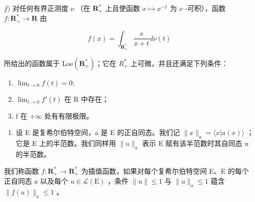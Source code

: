 \(f)\) 对任何有界正测度 \(\nu\) （在 \(\mathbf{R}_{+}^{*}\) 上且使函数 \(x\mapsto x^{-1}\) 为 \(\nu\) -可积），函数 \(f\colon\mathbf{R}_{+}^{*}\to\mathbf{R}\) 由

\[
f (x) = \int_ {\mathbf {R} _ {+} ^ {*}} \frac {x}{x + t} d \nu (t)
\]

所给出的函数属于 \(\text{Loe}(\mathbf{R}_{+}^{*})\)；它在 \(R_{+}^{*}\) 上可微，并且还满足下列条件：

\begin{enumerate}
\def\labelenumi{(\roman{enumi})}
\item
  \(\lim_{t\to0}f(t)=0;\)
\item
  \(\lim_{t\to0}f'(t)\) 在 R 中存在；
\item
  f 在 \(+\infty\) 处有有限极限。
\end{enumerate}

\begin{enumerate}
\def\labelenumi{\arabic{enumi})}
\setcounter{enumi}{25}
\tightlist
\item
  设 E 是复希尔伯特空间，a 是 E 的正自同态。我们记 \(\|x\|_{a} = \langle x | a(x) \rangle\) ；它是 E 上的半范数。我们同样用 \(\|u\|_{a}\) 表示 E 赋有该半范数时其自同态 u 的半范数。
\end{enumerate}

我们称函数 \(f \colon \mathbf{R}_+^* \to \mathbf{R}_+^*\) 为插值函数，如果对每个复希尔伯特空间 E、E 的每个正自同态 \(a\) 以及每个 \(u \in \mathcal{L}(\mathrm{E})\) ，条件 \(\| u \| \leqslant 1\) 与 \(\| u \|_a \leqslant 1\) 蕴含 \(\| f(u) \|_a \leqslant 1\) 。

